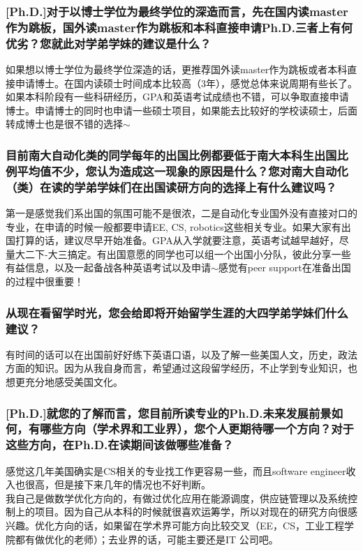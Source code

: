 \documentclass[a4paper,UTF8]{book}
\begin{document}
    \subsubsection*{[Ph.D.]对于以博士学位为最终学位的深造而言，先在国内读master作为跳板，国外读master作为跳板和本科直接申请Ph.D.三者上有何优劣？您就此对学弟学妹的建议是什么？}
    如果想以博士学位为最终学位深造的话，更推荐国外读master作为跳板或者本科直接申请博士。在国内读硕士时间成本比较高（3年），感觉总体来说周期有些长了。如果本科阶段有一些科研经历，GPA和英语考试成绩也不错，可以争取直接申请博士。申请博士的同时也申请一些硕士项目，如果能去比较好的学校读硕士，后面转成博士也是很不错的选择$\sim$

    \subsubsection*{目前南大自动化类的同学每年的出国比例都要低于南大本科生出国比例平均值不少，您认为造成这一现象的原因是什么？您对南大自动化（类）在读的学弟学妹们在出国读研方向的选择上有什么建议吗？}
    第一是感觉我们系出国的氛围可能不是很浓，二是自动化专业国外没有直接对口的专业，在申请的时候一般都要申请EE, CS, robotics这些相关专业。如果大家有出国打算的话，建议尽早开始准备。GPA从入学就要注意，英语考试越早越好，尽量大二下-大三搞定。有出国意愿的同学也可以组一个出国小分队，彼此分享一些有益信息，以及一起备战各种英语考试以及申请$\sim$感觉有peer support在准备出国的过程中很重要！

    \subsubsection*{从现在看留学时光，您会给即将开始留学生涯的大四学弟学妹们什么建议？}
    有时间的话可以在出国前好好练下英语口语，以及了解一些美国人文，历史，政法方面的知识。因为从我自身而言，希望通过这段留学经历，不止学到专业知识，也想更充分地感受美国文化。

    \subsubsection*{[Ph.D.]就您的了解而言，您目前所读专业的Ph.D.未来发展前景如何，有哪些方向（学术界和工业界），您个人更期待哪一个方向？对于这些方向，在Ph.D.在读期间该做哪些准备？}
    感觉这几年美国确实是CS相关的专业找工作更容易一些，而且software engineer收入也很高，但是接下来几年的情况也不好判断。\\
    我自己是做数学优化方向的，有做过优化应用在能源调度，供应链管理以及系统控制上的项目。因为自己从本科的时候就很喜欢运筹学，所以对现在的研究方向很感兴趣。优化方向的话，如果留在学术界可能方向比较交叉（EE，CS，工业工程学院都有做优化的老师）；去业界的话，可能主要还是IT 公司吧。
\end{document}
